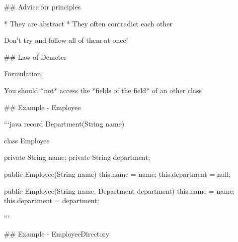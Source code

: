 ## Advice for principles

* They are abstract
* They often contradict each other

Don't try and follow all of them at once!

## Law of Demeter

Formulation:

You should *not* access the *fields of the field* of an other class

## Example - Employee

```java
record Department(String name) {}

class Employee {
    private String name;
    private String department;

    public Employee(String name) {
        this.name = name;
        this.department = null;
    }

    public Employee(String name, Department department) {
        this.name = name;
        this.department = department;
    }
}
```

## Example - EmployeeDirectory

